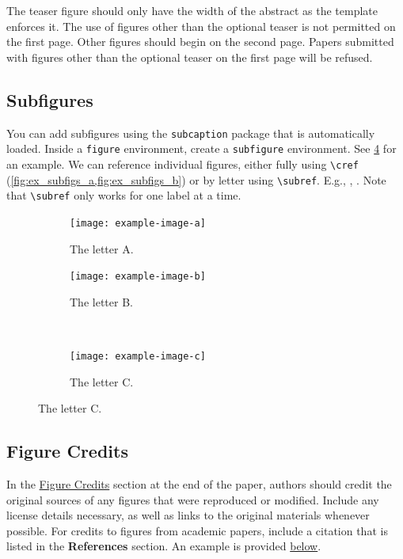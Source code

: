 \documentclass[journal]{vgtc}                     %
\begin{document}
The teaser figure should only have the width of the abstract as the template enforces it.
The use of figures other than the optional teaser is not permitted on the first page.
Other figures should begin on the second page.
Papers submitted with figures other than the optional teaser on the first page will be refused.

\subsection{Subfigures}

You can add subfigures using the \texttt{subcaption} package that is automatically loaded.
Inside a \verb|figure| environment, create a \verb|subfigure| environment.
See \cref{fig:ex_subfigs} for an example.
We can reference individual figures, either fully using \verb|\cref| (\cref{fig:ex_subfigs_a,fig:ex_subfigs_b}) or by letter using \verb|\subref|.
E.g., , .
Note that \verb|\subref| only works for one label at a time.

\begin{figure}[tbp]
  \centering
  \begin{subfigure}[b]{0.45\columnwidth}
  	\centering
  	\texttt{[image: example-image-a]}
  	\caption{The letter A.}
  	\label{fig:ex_subfigs_a}
  \end{subfigure}%
  \hfill%
  \begin{subfigure}[b]{0.45\columnwidth}
  	\centering
  	\texttt{[image: example-image-b]}
  	\caption{The letter B.}
  	\label{fig:ex_subfigs_b}
  \end{subfigure}%
  \\%
  \begin{subfigure}[b]{0.45\columnwidth}
  	\centering
  	\texttt{[image: example-image-c]}
  	\caption{The letter C.}
  	\label{fig:ex_subfigs_c}
  \end{subfigure}%
  \label{fig:ex_subfigs}
\end{figure}

\subsection{Figure Credits}
\label{sec:figure_credits_inst}

In the \hyperref[sec:figure_credits]{Figure Credits} section at the end of the paper, authors should credit the original sources of any figures that were reproduced or modified.
Include any license details necessary, as well as links to the original materials whenever possible.
For credits to figures from academic papers, include a citation that is listed in the \textbf{References} section.
An example is provided \hyperref[sec:figure_credits]{below}.
\end{document}
